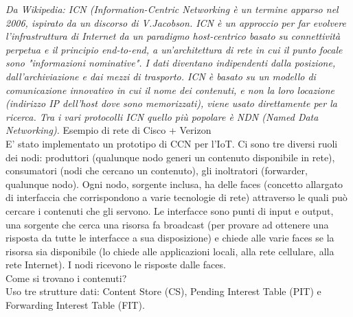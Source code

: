 \documentclass[12pt,italian]{report}
\begin{document}
\bigbreak
\textit{Da Wikipedia: ICN (Information-Centric Networking è un termine apparso nel 2006, ispirato da un discorso di V.Jacobson. ICN è un approccio per far evolvere l'infrastruttura di Internet da un paradigmo host-centrico basato su connettività perpetua e il principio end-to-end, a un'architettura di rete in cui il punto focale sono "informazioni nominative". I dati diventano indipendenti dalla posizione, dall'archiviazione e dai mezzi di trasporto. ICN è basato su un modello di comunicazione innovativo in cui il nome dei contenuti, e non la loro locazione (indirizzo IP dell'host dove sono memorizzati), viene usato direttamente per la ricerca. Tra i vari protocolli ICN quello più popolare è NDN (Named Data Networking).}
\bigbreak
\noindent Esempio di rete di Cisco + Verizon \\
E' stato implementato un prototipo di CCN per l'IoT. Ci sono tre diversi ruoli dei nodi: produttori (qualunque nodo generi un contenuto disponibile in rete), consumatori (nodi che cercano un contenuto), gli inoltratori (forwarder, qualunque nodo). 
\bigbreak
Ogni nodo, sorgente inclusa, ha delle faces (concetto allargato di interfaccia che corrispondono a varie tecnologie di rete) attraverso le quali può cercare i contenuti che gli servono. Le interfacce sono punti di input e output, una sorgente che cerca una risorsa fa broadcast (per provare ad ottenere una risposta da tutte le interfacce a sua disposizione) e chiede alle varie faces se la risorsa sia disponibile (lo chiede alle applicazioni locali, alla rete cellulare, alla rete Internet). I nodi ricevono le risposte dalle faces. \\
\bigbreak
\noindent Come si trovano i contenuti? \\
Uso tre strutture dati: Content Store (CS), Pending Interest Table (PIT) e Forwarding Interest Table (FIT). 
\end{document}
